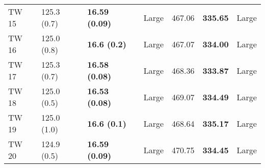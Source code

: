 \begin{tabular}{lllllll}
 TW 15 &       125.3 (0.7) &  \textbf{16.59 (0.09)} &       Large &                  467.06 &          \textbf{335.65} &       Large \\
 TW 16 &       125.0 (0.8) &    \textbf{16.6 (0.2)} &       Large &                  467.07 &          \textbf{334.00} &       Large \\
 TW 17 &       125.3 (0.7) &  \textbf{16.58 (0.08)} &       Large &                  468.36 &          \textbf{333.87} &       Large \\
 TW 18 &       125.0 (0.5) &  \textbf{16.53 (0.08)} &       Large &                  469.07 &          \textbf{334.49} &       Large \\
 TW 19 &       125.0 (1.0) &    \textbf{16.6 (0.1)} &       Large &                  468.64 &          \textbf{335.17} &       Large \\
 TW 20 &       124.9 (0.5) &  \textbf{16.59 (0.09)} &       Large &                  470.75 &          \textbf{334.45} &       Large \\
\bottomrule
\end{tabular}
